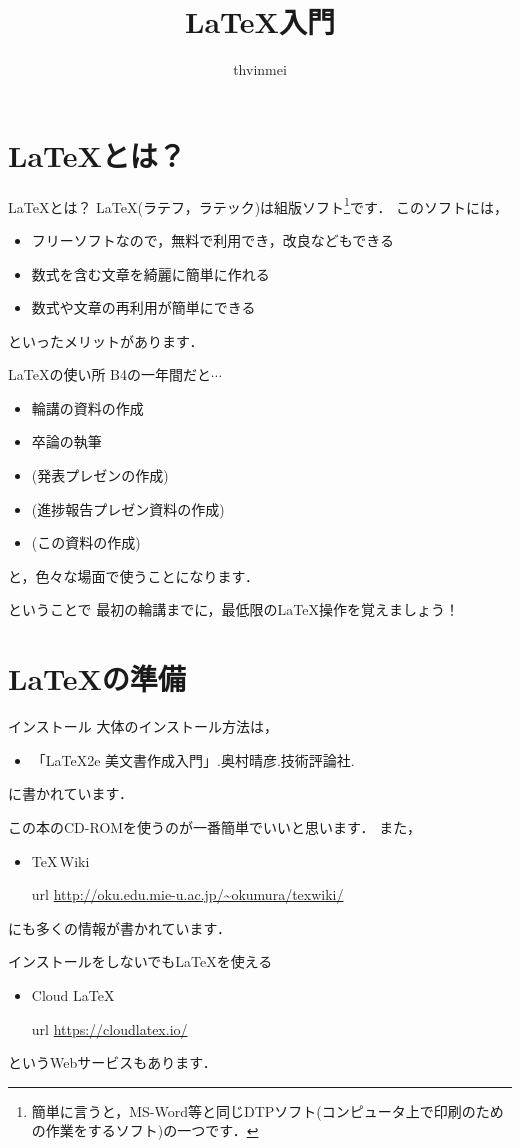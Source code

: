 \documentclass[slide,dvipdfmx]{beamer}
\title{\LaTeX 入門}
\author{thvinmei}
\begin{document}
\begin{frame}

\titlepage
\end{frame}

\section{\LaTeX とは？}
\begin{frame}{\LaTeX とは？}
\LaTeX (ラテフ，ラテック)は組版ソフト\footnote{簡単に言うと，MS-Word等と同じDTPソフト(コンピュータ上で印刷のための作業をするソフト)の一つです．}です．
このソフトには，
\begin{itemize}
\item フリーソフトなので，無料で利用でき，改良などもできる
\item 数式を含む文章を綺麗に簡単に作れる
\item 数式や文章の再利用が簡単にできる
\end{itemize}
といったメリットがあります．
\end{frame}

\begin{frame}{\LaTeX の使い所}
B4の一年間だと$\cdots$
\begin{itemize}
\item 輪講の資料の作成
\item 卒論の執筆
\item (発表プレゼンの作成)
\item (進捗報告プレゼン資料の作成)
\item (この資料の作成)
\end{itemize}
と，色々な場面で使うことになります．
\end{frame}


\begin{frame}{ということで}
最初の輪講までに，最低限の\LaTeX 操作を覚えましょう！
\end{frame}
\section{\LaTeX の準備}
\begin{frame}{インストール}
大体のインストール方法は，
\begin{itemize}
\item 「\LaTeX2e 美文書作成入門」.奥村晴彦.技術評論社.
\end{itemize}
に書かれています．

この本のCD-ROMを使うのが一番簡単でいいと思います．
また，
\begin{itemize}
\item \TeX \,Wiki
\item[url] \url{http://oku.edu.mie-u.ac.jp/~okumura/texwiki/}
\end{itemize}
にも多くの情報が書かれています．

インストールをしないでも\LaTeX を使える
\begin{itemize}
\item Cloud \LaTeX
\item[url] \url{https://cloudlatex.io/}
\end{itemize}
というWebサービスもあります．
\end{frame}
\end{document}
